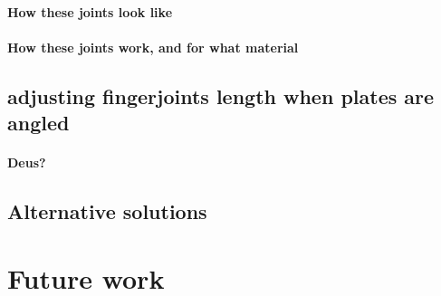 \documentclass[../ClassicThesis.tex]{subfiles}
\begin{document}
\paragraph{How these joints look like}
\paragraph{How these joints work, and for what material}

\subsection{adjusting fingerjoints length when plates are angled}
\paragraph{Deus?}

\subsection{Alternative solutions}


\section{Future work}
\end{document}
